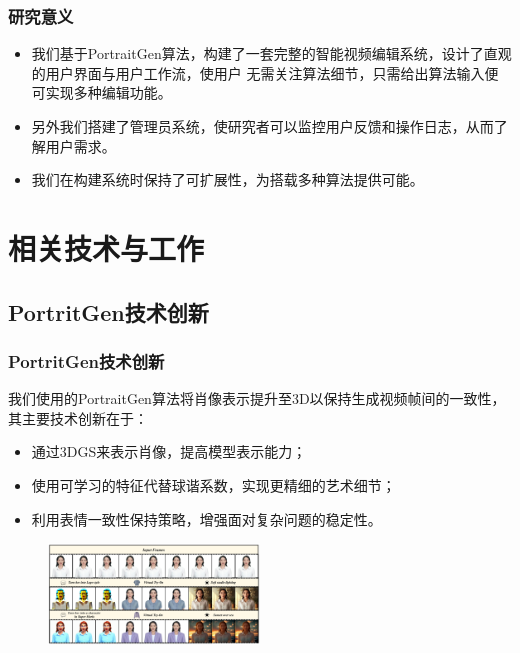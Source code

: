 \documentclass[aspectratio=169]{ctexbeamer}
\begin{document}
\begin{frame}
  \frametitle{研究意义}
  \begin{itemize}
    \item 我们基于PortraitGen算法，构建了一套完整的智能视频编辑系统，设计了直观的用户界面与用户工作流，使用户
    无需关注算法细节，只需给出算法输入便可实现多种编辑功能。
    \item 另外我们搭建了管理员系统，使研究者可以监控用户反馈和操作日志，从而了解用户需求。
    \item 我们在构建系统时保持了可扩展性，为搭载多种算法提供可能。
  \end{itemize}

\end{frame}

\section{相关技术与工作}
\subsection{PortritGen技术创新}
\begin{frame}
  \frametitle{PortritGen技术创新}
  我们使用的PortraitGen算法将肖像表示提升至3D以保持生成视频帧间的一致性，其主要技术创新在于：
  \begin{itemize}
    \item 通过3DGS来表示肖像，提高模型表示能力；
    \item 使用可学习的特征代替球谐系数，实现更精细的艺术细节；
    \item 利用表情一致性保持策略，增强面对复杂问题的稳定性。
  \end{itemize}
  \begin{figure}
    \includegraphics[width=0.5\textwidth]{source/portraitgen.png}
  \end{figure}
\end{frame}
\end{document}

